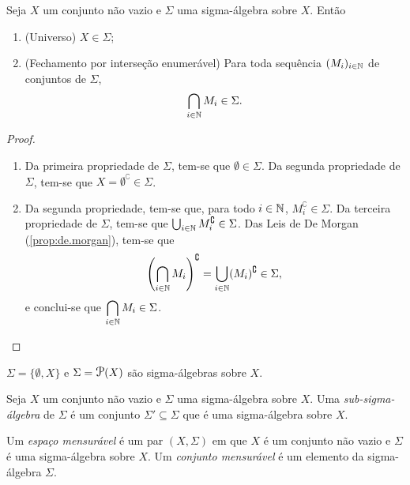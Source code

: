 \begin{prop}
	Seja $X$ um conjunto não vazio e $\Sigma$ uma sigma-álgebra sobre $X$. Então
	\begin{enumerate}
	\item (Universo) $X \in \Sigma$;
	\item (Fechamento por interseção enumerável) Para toda sequência $(M_i)_{i \in \mathbb{N}}$ de conjuntos de $\Sigma$,
	\begin{equation*}
	\bigcap_{i \in \mathbb{N}} M_i \in \Sigma.
	\end{equation*}
	\end{enumerate}
\end{prop}
\begin{proof}
	\begin{enumerate}
	\item Da primeira propriedade de $\Sigma$, tem-se que $\emptyset \in \Sigma$. Da segunda propriedade de $\Sigma$, tem-se que $X = \emptyset^\complement \in \Sigma$.
	\item Da segunda propriedade, tem-se que, para todo $i \in \mathbb{N}$, $M_i^\complement \in \Sigma$. Da terceira propriedade de $\Sigma$, tem-se que $\bigcup_{i \in \mathbb{N}} M_i^\complement \in \Sigma$. Das Leis de De Morgan (\ref{prop:de.morgan}), tem-se que
	\begin{equation*}
	\left(\bigcap_{i \in \mathbb{N}} M_i \right)^\complement = \bigcup_{i \in \mathbb{N}} (M_i)^\complement \in \Sigma,
	\end{equation*}
e conclui-se que $\displaystyle\bigcap_{i \in \mathbb{N}} M_i \in \Sigma$.
	\end{enumerate}
\end{proof}

\begin{ex}
	$\Sigma = \{\emptyset,X\}$ e $\Sigma = \p(X)$ são sigma-álgebras sobre $X$.
\end{ex}

\begin{defi}
Seja $X$ um conjunto não vazio e $\Sigma$ uma sigma-álgebra sobre $X$. Uma \emph{sub-sigma-álgebra} de $\Sigma$ é um conjunto $\Sigma' \subseteq \Sigma$ que é uma sigma-álgebra sobre $X$.
\end{defi}

\begin{defi}
	Um \emph{espaço mensurável} é um par $(X,\Sigma)$ em que $X$ é um conjunto não vazio e $\Sigma$ é uma sigma-álgebra sobre $X$. Um \emph{conjunto mensurável} é um elemento da sigma-álgebra $\Sigma$.
\end{defi}

